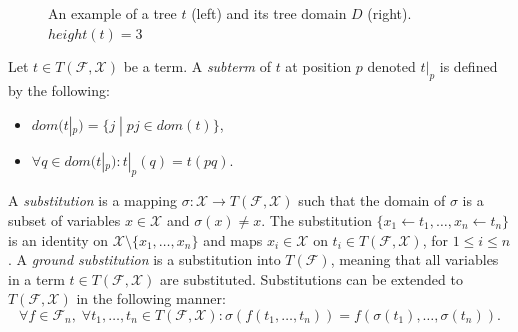 \begin{figure}[H]
    \centering
    \caption{An example of a tree $t$ (left) and its tree domain $D$ (right). $height(t) = 3$}
    \label{fig_tree_domain}
\end{figure}

\begin{defn}
Let $t \in T(\mathcal{F}, \mathcal{X})$ be a term. A \emph{subterm} of $t$ at position $p$ denoted $t|_p$ is defined by the following:
\begin{itemize}
    \item $dom(t|_p) = \{j \; | \; pj \in dom(t)\}$,
    \item $\forall q \in dom(t|_p): t|_p(q) = t(pq)$.
\end{itemize}
\end{defn}

\begin{defn}
A \emph{substitution} is a mapping $\sigma: \mathcal{X} \rightarrow T(\mathcal{F}, \mathcal{X})$ such that the domain of $\sigma$ is a subset of variables $x \in \mathcal{X}$ and $\sigma(x) \neq x$. The substitution $\{x_1 \leftarrow t_1, \dots, x_n \leftarrow t_n\}$ is an identity on $\mathcal{X} \setminus \{x_1, \dots, x_n\}$ and maps $x_i \in \mathcal{X}$ on $t_i \in T(\mathcal{F}, \mathcal{X})$, for $1 \leq i \leq n$. A \emph{ground substitution} is a substitution into $T(\mathcal{F})$, meaning that all variables in a term $t \in T(\mathcal{F}, \mathcal{X})$ are substituted. Substitutions can be extended to $T(\mathcal{F}, \mathcal{X})$ in the following manner: $$\forall f \in \mathcal{F}_n, \; \forall t_1, \dots, t_n \in T(\mathcal{F}, \mathcal{X}): \sigma(f(t_1, \dots, t_n)) = f(\sigma(t_1), \dots, \sigma(t_n)).$$
\end{defn}

